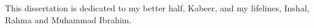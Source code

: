 



This dissertation is dedicated to my better half, Kabeer, and my lifelines, Inshal, Rahma and Muhammad Ibrahim.